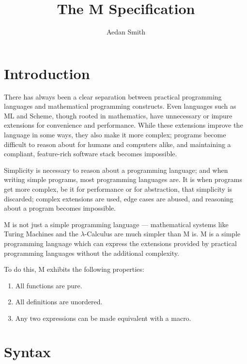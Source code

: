 \documentclass[11pt]{article}
\title{The M Specification}
\author{Aedan Smith}
\begin{document}
    \maketitle
    \newpage

    \tableofcontents
    \newpage

    \section{Introduction}\label{sec:introduction}

    There has always been a clear separation between practical programming languages and mathematical programming constructs.
    Even languages such as ML and Scheme, though rooted in mathematics, have unnecessary or impure extensions for convenience and performance.
    While these extensions improve the language in some ways, they also make it more complex;
    programs become difficult to reason about for humans and computers alike, and maintaining a compliant, feature-rich software stack becomes impossible.

    Simplicity is necessary to reason about a programming language;
    and when writing simple programs, most programming languages are.
    It is when programs get more complex, be it for performance or for abstraction, that simplicity is discarded;
    complex extensions are used, edge cases are abused, and reasoning about a program becomes impossible.

    M is not just a simple programming language --- mathematical systems like Turing Machines and the $\lambda$-Calculus are much simpler than M is.
    M is a simple programming language which can express the extensions provided by practical programming languages without the additional complexity.

    To do this, M exhibits the following properties:
    \begin{enumerate}
        \item All functions are pure.
        \item All definitions are unordered.
        \item Any two expressions can be made equivalent with a macro.
    \end{enumerate}
    \newpage

    \section{Syntax}\label{sec:syntax}
\end{document}
